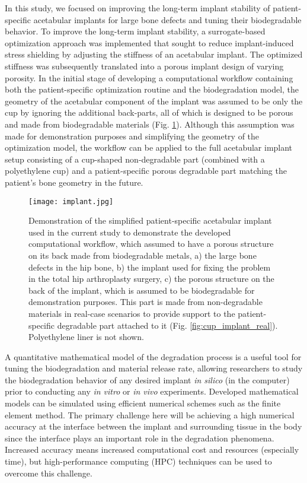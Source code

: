 In this study, we focused on improving the long-term implant stability of patient-specific acetabular implants for large bone defects and tuning their biodegradable behavior. To improve the long-term implant stability, a surrogate-based optimization approach was implemented that sought to reduce implant-induced stress shielding by adjusting the stiffness of an acetabular implant. The optimized stiffness was subsequently translated into a porous implant design of varying porosity. In the initial stage of developing a computational workflow containing both the patient-specific optimization routine and the biodegradation model, the geometry of the acetabular component of the implant was assumed to be only the cup by ignoring the additional back-parts, all of which is designed to be porous and made from biodegradable materials (Fig. \ref{fig:cup_implant}). Although this assumption was made for demonstration purposes and simplifying the geometry of the optimization model, the workflow can be applied to the full acetabular implant setup consisting of a cup-shaped non-degradable part (combined with a polyethylene cup) and a patient-specific porous degradable part matching the patient's bone geometry in the future.

\begin{figure}[h]
\centering
\medskip
\texttt{[image: implant.jpg]}
\caption[Demonstration of the simplified patient-specific acetabular implant]{Demonstration of the simplified patient-specific acetabular implant used in the current study to demonstrate the developed computational workflow, which assumed to have a porous structure on its back made from biodegradable metals, a) the large bone defects in the hip bone, b) the implant used for fixing the problem in the total hip arthroplasty surgery, c) the porous structure on the back of the implant, which is assumed to be biodegradable for demonstration purposes. This part is made from non-degradable materials in real-case scenarios to provide support to the patient-specific degradable part attached to it (Fig. \ref{fig:cup_implant_real}). Polyethylene liner is not shown.} \label{fig:cup_implant}
\end{figure}

A quantitative mathematical model of the degradation process is a useful tool for tuning the biodegradation and material release rate, allowing researchers to study the biodegradation behavior of any desired implant \textit{in silico} (in the computer) prior to conducting any \textit{in vitro} or \textit{in vivo} experiments. Developed mathematical models can be simulated using efficient numerical schemes such as the finite element method. The primary challenge here will be achieving a high numerical accuracy at the interface between the implant and surrounding tissue in the body since the interface plays an important role in the degradation phenomena. Increased accuracy means increased computational cost and resources (especially time), but high-performance computing ({HPC}) techniques can be used to overcome this challenge.

